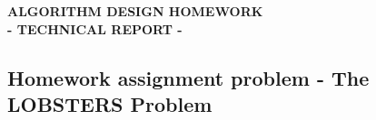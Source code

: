 \documentclass{article}%
\begin{document}
%
\normalsize%
\pagestyle{header}%

        \vspace*{\fill}
        \begin{center}
            \LARGE \textbf{ALGORITHM DESIGN HOMEWORK} \\
            \Large \textbf{- TECHNICAL REPORT -}
        \end{center}
        \vspace*{\fill}
\newpage%
    
        \vspace*{\fill}     
        \begin{center}
            \LARGE \section{Homework assignment problem - The LOBSTERS Problem}
            \vspace{0.5cm}
        \end{center}
\end{document}
